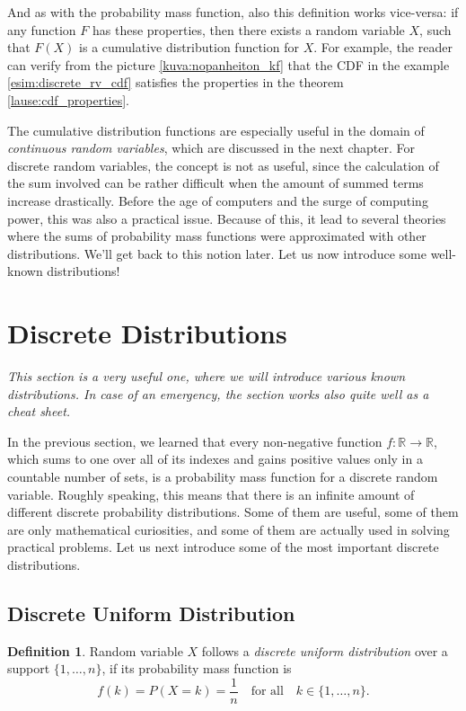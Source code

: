 \documentclass[12pt,a4paper,leqno]{report}
\newcommand{\R}{\mathbb{R}}
\theoremstyle{plain}
\theoremstyle{definition}
\newtheorem{maar}[equation]{Definition}
\begin{document}
\bigskip

And as with the probability mass function, also this definition works vice-versa: if any function $F$ has these properties, then there exists a random variable $X$, such that $F(X)$ is a cumulative distribution function for $X$. For example, the reader can verify from the picture \ref{kuva:nopanheiton_kf} that the CDF in the example \ref{esim:discrete_rv_cdf} satisfies the properties in the theorem  \ref{lause:cdf_properties}.

The cumulative distribution functions are especially useful in the domain of \emph{continuous random variables}, which are discussed in the next chapter. For discrete random variables, the concept is not as useful, since the calculation of the sum involved can be rather difficult when the amount of summed terms increase drastically. Before the age of computers and the surge of computing power, this was also a practical issue. Because of this, it lead to several theories where the sums of probability mass functions were approximated with other distributions. We'll get back to this notion later. Let us now introduce some well-known distributions!

\section{Discrete Distributions}

\emph{This section is a very useful one, where we will introduce various known distributions. In case of an emergency, the section works also quite well as a cheat sheet.}

In the previous section, we learned that every non-negative function $f:\R \rightarrow \R$, which sums to one over all of its indexes and gains positive values only in a countable number of sets, is a probability mass function for a discrete random variable. Roughly speaking, this means that there is an infinite amount of different discrete probability distributions. Some of them are useful, some of them are only mathematical curiosities, and some of them are actually used in solving practical problems. Let us next introduce some of the most important discrete distributions.

\subsection{Discrete Uniform Distribution}

\begin{maar}\label{discrete_uniform_distr}
Random variable $X$ follows a \emph{discrete uniform distribution}  over a support $\{1, \dots, n\}$, if its probability mass function is
\[
f(k) = P(X=k) = \frac{1}{n} \quad \text{for all} \quad k \in \{1, \dots, n\}. 
\]
\end{maar}
\end{document}
